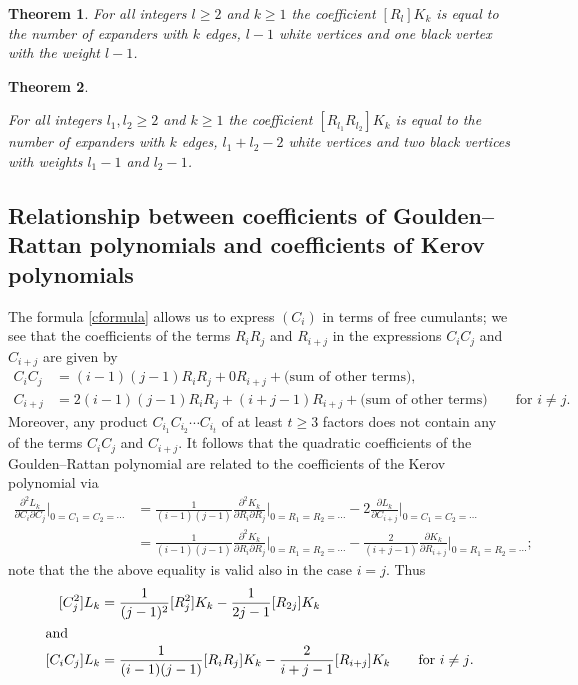 \documentclass[submission]{FPSAC2021}
\newtheorem{theorem}{Theorem}
\begin{document}
\begin{theorem}
\label{thm2}
For all integers $l\geq2$ and $k\geq 1$ the coefficient $[R_l] K_k$ is equal to the number of expanders with $k$ edges, $l-1$ white vertices and one black vertex with the weight $l-1$.
\end{theorem}

\begin{theorem}
\label{thm4} 

For all integers $l_1, l_2\geq 2$ and $k\geq 1$ the coefficient
$[R_{l_1} R_{l_2}] K_k$ is equal to the number of expanders with $k$ edges,
$l_1+l_2-2$ white vertices and two black vertices with weights $l_1-1$ and
$l_2-1$.
\end{theorem}

\subsection{Relationship between coefficients of Goulden--Rattan polynomials 
and coefficients of Kerov polynomials}

The formula \eqref{cformula} allows us to express $(C_i)$ in terms of free cumulants;
we see that the coefficients of the terms $R_i R_j$ and $R_{i+j}$ in the expressions
$C_{i} C_{j}$ and $C_{i+j}$ are given by
\begin{align*}
C_i C_j &= (i-1)(j-1) R_i R_j + 0  R_{i+j} + \text{(sum of other terms)},\\
C_{i+j} &=2(i-1)(j-1)R_iR_j+(i+j-1)R_{i+j}+\text{(sum of other terms)} 
\qquad \text{for $i\neq j$.}
\end{align*}
Moreover, any product $C_{i_1} C_{i_2}\cdots C_{i_t}$ of at least $t\geq 3$ factors does not contain any of the terms $C_i C_j$ and $C_{i+j}$.
It follows that the quadratic coefficients of the Goulden--Rattan polynomial are 
related to the coefficients of the Kerov polynomial via
\begin{align*}
\frac{\partial^2L_k}{\partial{C_i}\partial{C_j}}\Bigg|_{0=C_1=C_2=\cdots}
&=\frac{1}{(i-1)(j-1)}\frac{\partial^2K_k}{\partial{R_i}\partial{R_j}}\Bigg|_{0=R_1=R_2=\cdots}
-2\frac{\partial L_k}{\partial{C_{i+j}}}\Bigg|_{0=C_1=C_2=\cdots}\\
&=\frac{1}{(i-1)(j-1)}\frac{\partial^2K_k}{\partial{R_i}\partial{R_j}}\Bigg|_{0=R_1=R_2=\cdots}
-\frac{2}{(i+j-1)}\frac{\partial K_k}{\partial{R_{i+j}}}\Bigg|_{0=R_1=R_2=\cdots};
\end{align*}
note that the the above equality is valid also in the case $i=j$. Thus
\begin{align}
\label{formula}
[C_j^2]L_k &=\frac{1}{(j-1)^2}[R_j^2]K_k-\frac{1}{2j-1}[R_{2j}]K_k \\
\intertext{and}
[C_iC_j]L_k &=\frac{1}{(i-1)(j-1)}[R_iR_j]K_k-\frac{2}{i+j-1}[R_{i+j}]K_k
\qquad \text{for $i\neq j$.}
\end{align}
\end{document}
